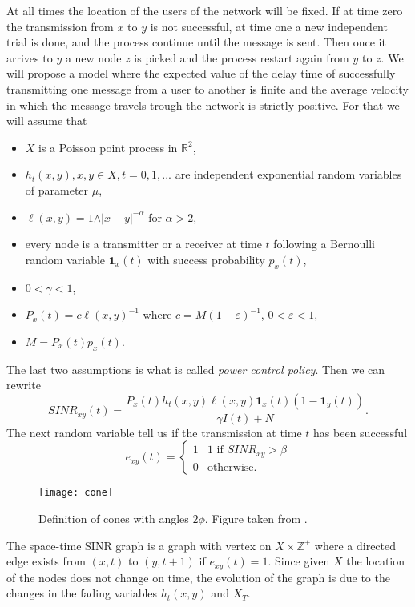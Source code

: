 At all times the location of the users of the network will be fixed. If at time zero the transmission from $x$ to $y$ is not successful, at time one a new independent trial is done, and the process continue until the message is sent. Then once it arrives to $y$ a new node $z$ is picked and the process restart again from $y$ to $z$. We will propose a model where the expected value of the delay time of successfully transmitting one message from a user to another is finite and the average velocity in which the message travels trough the network is strictly positive. For that we will assume that
\begin{itemize}
  \item $X$ is a Poisson point process in $\mathbb{R}^2$, 
  \item ${h_{t}(x,y),x,y\in X,t=0,1,...}$ are independent exponential random variables of parameter $\mu$,
  \item $\ell(x,y)=1\wedge\vert x-y\vert^{-\alpha} $ for $\alpha>2$,
  \item every node is a transmitter or a receiver at time $t$ following a Bernoulli random variable $\textbf{1}_x(t)$ with success probability $p_x(t)$,
  \item $0<\gamma<1$,
  \item $P_x(t)=c\ell(x,y)^{-1}$ where $c=M(1-\varepsilon)^{-1}$, $0<\varepsilon<1$,
  \item $M=P_x(t)p_x(t).$
\end{itemize}
The last two assumptions is what is called \textit{power control policy}. Then we can rewrite 
$$SINR_{xy} (t)=\frac{P_x(t)h_t(x,y)\ell(x,y)\textbf{1}_x(t)(1-\textbf{1}_y(t))}{\gamma I(t)+N}. $$
The next random variable tell us if the transmission at time $t$ has been successful
\begin{displaymath}
e_{xy}(t)= \left\{ \begin{array}{ll}
1 & \textrm{1 if $SINR_{xy}>\beta$}\\
0 & \textrm{otherwise}.
\end{array} \right.
\end{displaymath}

\begin{figure}
\captionsetup{width=1\textwidth}
  \centering
    \texttt{[image: cone]}
    \caption{Definition of cones with angles $2\phi$. Figure taken from \cite{Iye}.}
    \label{figcone}
\end{figure}
\begin{defn} The space-time SINR graph is a graph with vertex on $X\times\mathbb{Z}^{+}$ where a directed edge exists from $(x,t)$ to $(y,t+1)$ if $e_{xy}(t)=1$. Since given $X$ the location of the nodes does not change on time, the evolution of the graph is due to the changes in the fading variables $h_t(x,y)$ and $X_T$.
\end{defn}



